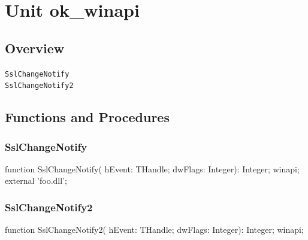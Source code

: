 \documentclass{report}
\begin{document}
\newlength{\tmplength}
\chapter{Unit ok{\_}winapi}
\section{Overview}
\begin{description}
\item[\texttt{SslChangeNotify}]
\item[\texttt{SslChangeNotify2}]
\end{description}
\section{Functions and Procedures}
\subsection*{SslChangeNotify}
\begin{list}{}{
\setlength{\itemindent}{0cm}
\setlength{\listparindent}{0cm}
\setlength{\leftmargin}{\evensidemargin}
\addtolength{\leftmargin}{\tmplength}
\settowidth{\labelsep}{X}
\addtolength{\leftmargin}{\labelsep}
\setlength{\labelwidth}{\tmplength}
}
\begin{flushleft}
\item[\textbf{Declaration}\hfill]
\begin{ttfamily}
function SslChangeNotify( hEvent: THandle; dwFlags: Integer): Integer; winapi; external 'foo.dll';\end{ttfamily}


\end{flushleft}
\end{list}
\subsection*{SslChangeNotify2}
\begin{list}{}{
\setlength{\itemindent}{0cm}
\setlength{\listparindent}{0cm}
\setlength{\leftmargin}{\evensidemargin}
\addtolength{\leftmargin}{\tmplength}
\settowidth{\labelsep}{X}
\addtolength{\leftmargin}{\labelsep}
\setlength{\labelwidth}{\tmplength}
}
\begin{flushleft}
\item[\textbf{Declaration}\hfill]
\begin{ttfamily}
function SslChangeNotify2( hEvent: THandle; dwFlags: Integer): Integer; winapi;\end{ttfamily}


\end{flushleft}
\end{list}
\end{document}
